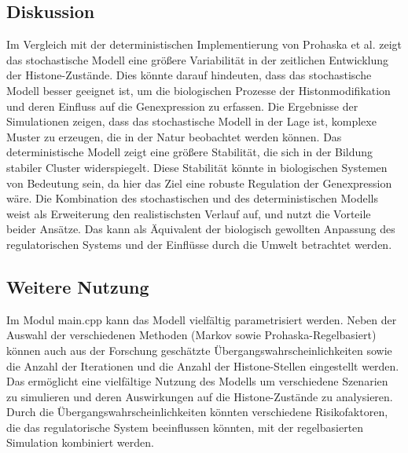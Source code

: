 \documentclass{SeminarV2}
\begin{document}
\begin{itemize}
\section{Diskussion}
Im Vergleich mit der deterministischen Implementierung von Prohaska et al. zeigt das stochastische Modell eine größere Variabilität in der zeitlichen Entwicklung der Histone-Zustände. Dies könnte darauf hindeuten, dass das stochastische Modell besser geeignet ist, um die biologischen Prozesse der Histonmodifikation und deren Einfluss auf die Genexpression zu erfassen. Die Ergebnisse der Simulationen zeigen, dass das stochastische Modell in der Lage ist, komplexe Muster zu erzeugen, die in der Natur beobachtet werden können.
Das deterministische Modell zeigt eine größere Stabilität, die sich in der Bildung stabiler Cluster widerspiegelt. Diese Stabilität könnte in biologischen Systemen von Bedeutung sein, da hier das Ziel eine robuste Regulation der Genexpression wäre.
Die Kombination des stochastischen und des deterministischen Modells weist als Erweiterung den realistischsten Verlauf auf, und nutzt die Vorteile beider Ansätze. 
Das kann als Äquivalent der biologisch gewollten Anpassung des regulatorischen Systems und der Einflüsse durch die Umwelt betrachtet werden.

\subsection{Weitere Nutzung}
Im Modul main.cpp kann das Modell vielfältig parametrisiert werden. Neben der Auswahl der verschiedenen Methoden (Markov sowie Prohaska-Regelbasiert) können auch aus der Forschung geschätzte Übergangswahrscheinlichkeiten sowie die Anzahl der Iterationen und die Anzahl der Histone-Stellen eingestellt werden.
Das ermöglicht eine vielfältige Nutzung des Modells um verschiedene Szenarien zu simulieren und deren Auswirkungen auf die Histone-Zustände zu analysieren.
Durch die Übergangswahrscheinlichkeiten könnten verschiedene Risikofaktoren, die das regulatorische System beeinflussen könnten, mit der regelbasierten Simulation kombiniert werden.

\end{itemize}
\end{document}
